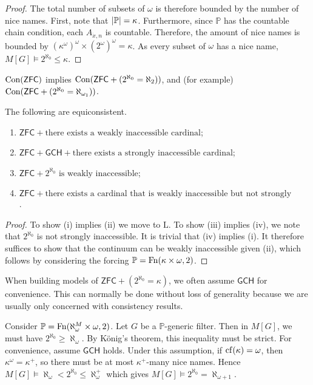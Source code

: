 \begin{proof}
    The total number of subsets of \( \omega \) is therefore bounded by the number of nice names.
    First, note that \( \abs{\mathbb P} = \kappa \).
    Furthermore, since \( \mathbb P \) has the countable chain condition, each \( A_{\dot x, n} \) is countable.
    Therefore, the amount of nice names is bounded by \( (\kappa^\omega)^\omega \times (2^\omega)^\omega = \kappa \).
    As every subset of \( \omega \) has a nice name, \( M[G] \vDash 2^{\aleph_0} \leq \kappa \).
\end{proof}
\begin{corollary}
    \( \operatorname{Con}(\mathsf{ZFC}) \) implies \( \operatorname{Con}(\mathsf{ZFC} + (2^{\aleph_0} = \aleph_2)) \), and (for example) \( \operatorname{Con}(\mathsf{ZFC} + (2^{\aleph_0} = \aleph_{\omega_1})) \).
\end{corollary}
\begin{corollary}
    The following are equiconsistent.
    \begin{enumerate}
        \item \( \mathsf{ZFC} + \text{there exists a weakly inaccessible cardinal} \);
        \item \( \mathsf{ZFC} + \mathsf{GCH} + \text{there exists a strongly inaccessible cardinal} \);
        \item \( \mathsf{ZFC} + 2^{\aleph_0} \text{ is weakly inaccessible} \);
        \item \( \mathsf{ZFC} + \text{there exists a cardinal that is weakly inaccessible but not strongly inaccessible} \).
    \end{enumerate}
\end{corollary}
\begin{proof}
    To show (i) implies (ii) we move to \( \mathrm{L} \).
    To show (iii) implies (iv), we note that \( 2^{\aleph_0} \) is not strongly inaccessible.
    It is trivial that (iv) implies (i).
    It therefore suffices to show that the continuum can be weakly inaccessible given (ii), which follows by considering the forcing \( \mathbb P = \operatorname{Fn}(\kappa \times \omega, 2) \).
\end{proof}
\begin{remark}
    When building models of \( \mathsf{ZFC} + (2^{\aleph_0} = \kappa) \), we often assume \( \mathsf{GCH} \) for convenience.
    This can normally be done without loss of generality because we are usually only concerned with consistency results.
\end{remark}
\begin{example}
    Consider \( \mathbb P = \operatorname{Fn}(\aleph_\omega^M \times \omega, 2) \).
    Let \( G \) be a \( \mathbb P \)-generic filter.
    Then in \( M[G] \), we must have \( 2^{\aleph_0} \geq \aleph_\omega \).
    By K\"onig's theorem, this inequality must be strict.
    For convenience, assume \( \mathsf{GCH} \) holds.
    Under this assumption, if \( \operatorname{cf}(\kappa) = \omega \), then \( \kappa^\omega = \kappa^+ \), so there must be at most \( \kappa^+ \)-many nice names.
    Hence \( M[G] \vDash \aleph_\omega < 2^{\aleph_0} \leq \aleph_\omega^+ \) which gives \( M[G] \vDash 2^{\aleph_0} = \aleph_{\omega + 1} \).
\end{example}
